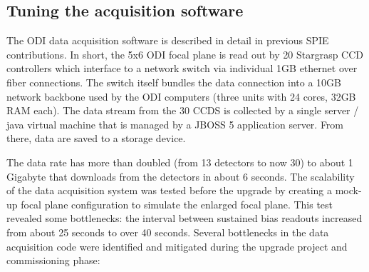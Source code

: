 \documentclass[]{spieman}
\begin{document}
\subsection{Tuning the acquisition software}

The ODI data acquisition software is described in detail in previous SPIE
contributions\cite{Yeatts2008,Yeatts2010}. In short, the 5x6 ODI focal plane is
read out by 20 Stargrasp CCD controllers which interface to a network switch via
individual  1GB ethernet over fiber connections. The switch itself bundles the
data connection into a 10GB network backbone used by the ODI computers (three
units with 24 cores, 32GB RAM each). The data stream from the 30 CCDS is
collected by a single server / java virtual machine that is managed by a JBOSS 5
application server. From there, data are saved to a storage device.

The data rate has more than doubled (from 13 detectors to now 30) to about 1
Gigabyte that downloads from the detectors in about 6 seconds.  The scalability
of the data acquisition system was tested before the upgrade by creating a
mock-up focal plane  configuration to simulate the enlarged focal plane. This
test revealed some bottlenecks: the interval between sustained bias readouts
increased from about 25 seconds to over 40 seconds. Several bottlenecks in the
data acquisition code were identified and mitigated during the upgrade project
and commissioning phase:
\end{document}
